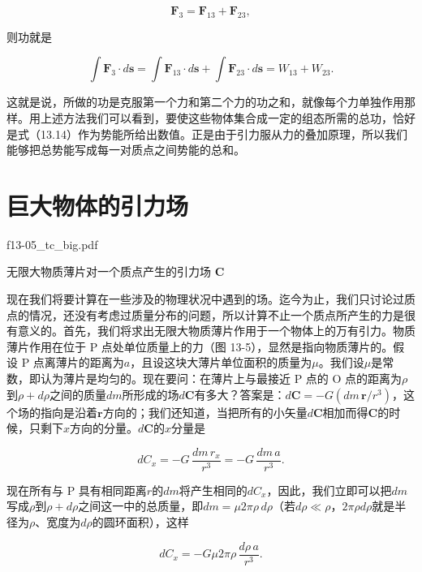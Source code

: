 \documentclass[12pt,oneside]{book}
\providecommand{\FLPvec}[1]{\boldsymbol{#1}}
\providecommand{\FLPC}[0]{\FLPvec{C}}
\providecommand{\FLPF}[0]{\FLPvec{F}}
\providecommand{\FLPr}[0]{\FLPvec{r}}
\providecommand{\FLPs}[0]{\FLPvec{s}}
\begin{document}
\begin{equation*}
\FLPF_3=\FLPF_{13}+\FLPF_{23},
\end{equation*}

则功就是

\begin{equation*}
\int\FLPF_3\cdot d\FLPs=
\int\FLPF_{13}\cdot d\FLPs+\int\FLPF_{23}\cdot d\FLPs=
W_{13}+W_{23}.
\end{equation*}

这就是说，所做的功是克服第一个力和第二个力的功之和，就像每个力单独作用那样。用上述方法我们可以看到，要使这些物体集合成一定的组态所需的总功，恰好是式（13.14）作为势能所给出数值。正是由于引力服从力的叠加原理，所以我们能够把总势能写成每一对质点之间势能的总和。



\section{巨大物体的引力场}
\begin{fig}{f13-05_tc_big.pdf}
\caption{无限大物质薄片对一个质点产生的引力场 $\mathbf{C}$}
\label{fig:13-5}
\end{fig}

现在我们将要计算在一些涉及的物理状况中遇到的场。迄今为止，我们只讨论过质点的情况，还没有考虑过质量分布的问题，所以计算不止一个质点所产生的力是很有意义的。首先，我们将求出无限大物质薄片作用于一个物体上的万有引力。物质薄片作用在位于 P 点处单位质量上的力（图 13-5），显然是指向物质薄片的。假设 P 点离薄片的距离为$a$，且设这块大薄片单位面积的质量为$\mu$。我们设$\mu$是常数，即认为薄片是均匀的。现在要问：在薄片上与最接近 P 点的 O 点的距离为$\rho$到$\rho+d\rho$之间的质量$dm$所形成的场$d\FLPC$有多大？答案是：$d\FLPC = -G(dm\,\FLPr/r^3)$，这个场的指向是沿着$\FLPr$方向的；我们还知道，当把所有的小矢量$d\FLPC$相加而得$\FLPC$的时候，只剩下$x$方向的分量。$d\FLPC$的$x$分量是

\begin{equation*}
dC_x=-G\,\frac{dm\,r_x}{r^3}=-G\,\frac{dm\,a}{r^3}.
\end{equation*}


现在所有与 P 具有相同距离$r$的$dm$将产生相同的$dC_{x}$，因此，我们立即可以把$dm$写成$\rho$到$\rho+d\rho$之间这一中的总质量，即$dm = \mu2\pi\rho\,d\rho$（若$d\rho\ll\rho$，$2\pi\rho d\rho$就是半径为$\rho$、宽度为$d\rho$的圆环面积），这样


\begin{equation*}
dC_x=-G\mu2\pi\rho\,\frac{d\rho\,a}{r^3}.
\end{equation*}
\end{document}
